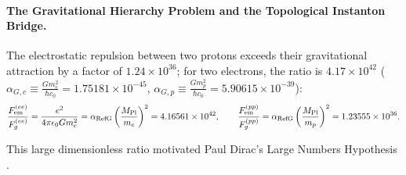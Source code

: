 \documentclass[11pt,a4paper]{article}
\begin{document}
\paragraph{The Gravitational Hierarchy Problem and the Topological Instanton Bridge.} The electrostatic repulsion between two protons exceeds their gravitational attraction by a factor of $1.24\times 10^{36}$; for two electrons, the ratio is $4.17\times 10^{42}$ ($\alpha_{G,e} \equiv \frac{G m_e^2}{\hbar c_0} = 1.75181\times 10^{-45}$, $\alpha_{G,p} \equiv \frac{G m_p^2}{\hbar c_0} = 5.90615\times 10^{-39}$):
\begin{equation}
\frac{F_{\rm em}^{(ee)}}{F_g^{(ee)}} = \frac{e^2}{4\pi\epsilon_0 G m_e^2} = \alpha_{\rm RefG} \left(\frac{M_{\rm Pl}}{m_e}\right)^2 = 4.16561 \times 10^{42}, \qquad \frac{F_{\rm em}^{(pp)}}{F_g^{(pp)}} = \alpha_{\rm RefG} \left(\frac{M_{\rm Pl}}{m_p}\right)^2 = 1.23555 \times 10^{36}.
\end{equation}

This large dimensionless ratio motivated Paul Dirac's Large Numbers Hypothesis \citep{dirac1937}.
\end{document}

